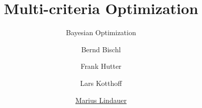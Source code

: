 


\newcommand{\q}[0]{\mathbf{q}}
\newcommand{\Xspace}[0]{\mathcal{X}}

\title[AutoML: Overview]{Multi-criteria Optimization}
\subtitle{Bayesian Optimization}
\author[Bernd Bischl]{Bernd Bischl \and Frank Hutter \and Lars Kotthoff \and \underline{Marius Lindauer}}
\institute{}
\date{}






	\maketitle



